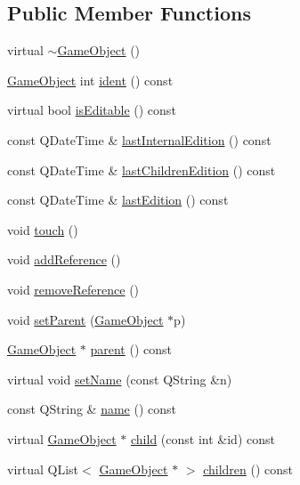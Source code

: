 \subsection*{\-Public \-Member \-Functions}
\begin{DoxyCompactItemize}
\item 
virtual \hyperlink{class_game_object_ab82dfdb656f9051c0587e6593b2dda97}{$\sim$\-Game\-Object} ()
\item 
\hyperlink{class_game_object}{\-Game\-Object} int \hyperlink{class_game_object_a21515212e3deb4123268f220e142b077}{ident} () const 
\item 
virtual bool \hyperlink{class_game_object_a2872920b7f531584e6a3cae7a84865b8}{is\-Editable} () const 
\item 
const \-Q\-Date\-Time \& \hyperlink{class_game_object_a0c4cc65819b30ec36a1c20a1c24997fe}{last\-Internal\-Edition} () const 
\item 
const \-Q\-Date\-Time \& \hyperlink{class_game_object_acc65ad08191fcaf558bd1840a45d23cf}{last\-Children\-Edition} () const 
\item 
const \-Q\-Date\-Time \& \hyperlink{class_game_object_a73b351287147712a937e87028bf8c876}{last\-Edition} () const 
\item 
void \hyperlink{class_game_object_a2130d5674df041b5a7eaf987f9b1e642}{touch} ()
\item 
void \hyperlink{class_game_object_a815c7f587c0ae528614add95655d9a0a}{add\-Reference} ()
\item 
void \hyperlink{class_game_object_a68725fd75f55bc73bb44216406ce34e5}{remove\-Reference} ()
\item 
void \hyperlink{class_game_object_ae34944b23d5d7d472d5c8da3f42fb2e3}{set\-Parent} (\hyperlink{class_game_object}{\-Game\-Object} $\ast$p)
\item 
\hyperlink{class_game_object}{\-Game\-Object} $\ast$ \hyperlink{class_game_object_af3deaf39cde23c189765634e32e95bb4}{parent} () const 
\item 
virtual void \hyperlink{class_game_object_ae928d2f18b5a26656ad41b7c27b463a7}{set\-Name} (const \-Q\-String \&n)
\item 
const \-Q\-String \& \hyperlink{class_game_object_aede5e0829a5fe107b1419bd62f03c132}{name} () const 
\item 
virtual \hyperlink{class_game_object}{\-Game\-Object} $\ast$ \hyperlink{class_game_object_a97fbf0507cf140b9f3abb568c6a97145}{child} (const int \&id) const 
\item 
virtual \-Q\-List$<$ \hyperlink{class_game_object}{\-Game\-Object} $\ast$ $>$ \hyperlink{class_game_object_a3f68b64d3a0793048cfe5deab35397e0}{children} () const 

\end{DoxyCompactItemize}
